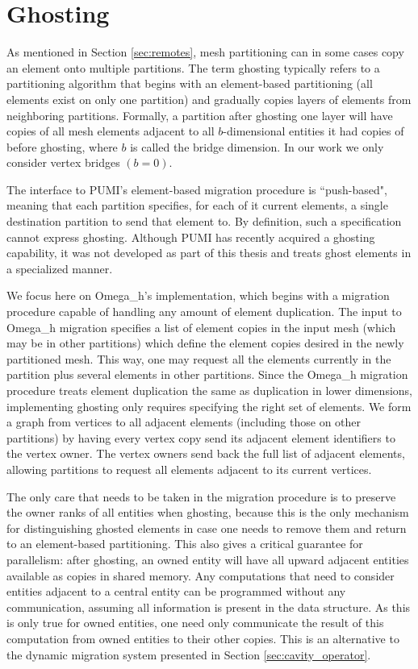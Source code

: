 \section{Ghosting}
\label{sec:ghost}

As mentioned in Section \ref{sec:remotes}, mesh partitioning can
in some cases copy an element onto multiple partitions.
The term ghosting typically refers to a partitioning algorithm
that begins with an element-based partitioning (all elements
exist on only one partition) and gradually copies layers of elements
from neighboring partitions.
Formally, a partition after ghosting one layer will have copies
of all mesh elements adjacent to all $b$-dimensional entities
it had copies of before ghosting, where $b$ is called the bridge dimension.
In our work we only consider vertex bridges $(b=0)$.

The interface to PUMI's element-based migration procedure is
``push-based", meaning that each partition specifies, for each
of it current elements, a single destination partition to send
that element to.
By definition, such a specification cannot express ghosting.
Although PUMI has recently acquired a ghosting capability, it was
not developed as part of this thesis and treats ghost elements
in a specialized manner.

We focus here on Omega\_h's implementation, which begins with
a migration procedure capable of handling any amount of element duplication.
The input to Omega\_h migration specifies a list of element copies
in the input mesh (which may be in other partitions) which define
the element copies desired in the newly partitioned mesh.
This way, one may request all the elements currently in the
partition plus several elements in other partitions.
Since the Omega\_h migration procedure treats element duplication
the same as duplication in lower dimensions, implementing ghosting
only requires specifying the right set of elements.
We form a graph from vertices to all adjacent elements (including
those on other partitions) by having every vertex copy send its
adjacent element identifiers to the vertex owner.
The vertex owners send back the full list of adjacent elements,
allowing partitions to request all elements adjacent to its current
vertices.

The only care that needs to be taken in the migration procedure
is to preserve the owner ranks of all entities when ghosting,
because this is the only mechanism for distinguishing ghosted
elements in case one needs to remove them and return to
an element-based partitioning.
This also gives a critical guarantee for parallelism:
after ghosting, an owned entity will have all upward adjacent
entities available as copies in shared memory.
Any computations that need to consider entities adjacent to
a central entity can be programmed without any communication,
assuming all information is present in the data structure.
As this is only true for owned entities, one need only communicate
the result of this computation from owned entities to their other
copies.
This is an alternative to the dynamic migration system
presented in Section \ref{sec:cavity_operator}.

